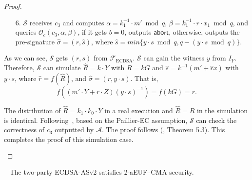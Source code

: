 \documentclass{llncs}
\begin{document}
\begin{proof}
\begin{trivlist}
\begin{itemize}
\item[6.] $\mathcal{S}$ receives $c_3$ and computes $\alpha=k_1^{-1}\cdot m' \bmod q$, $\beta=k_1^{-1}\cdot r\cdot x_1 \bmod q$, and queries $\mathcal{O}_c(c_3,\alpha,\beta)$, if it gets $b=0$, outputs $\mathsf{abort}$, otherwise, outputs the pre-signature $\hat{\sigma}=(r,\hat{s})$, where $\hat{s}=min\{y\cdot s \bmod q, q-(y\cdot s \bmod q)\}$. 
\end{itemize}
As we can see, $\mathcal{S}$ gets $(r,s)$ from $\mathcal{F}_{\text{ECDSA}}$. $\mathcal{S}$ can gain the witness $y$ from $I_Y$. Therefore, $\mathcal{S}$ can simulate $\hat{R}=k\cdot Y$ with $R=kG$ and $\hat{s}=k^{-1}(m'+\hat{r}x)$ with $y\cdot s$, where $\hat{r}=f(\hat{R})$, and $\hat{\sigma}=(r,y\cdot s)$. That is, 
$$f((m'\cdot Y+r\cdot Z)(y\cdot s)^{-1})=f(kG)=r.$$

The distribution of $\hat{R}=k_1\cdot k_0\cdot Y$ in a real execution and $\hat{R}=R$ in the simulation is identical. Following~\cite{Lin17}, based on the Paillier-EC assumption, $\mathcal{S}$ can check the correctness of $c_3$ outputted by $\mathcal{A}$. The proof follows (\cite{Lin17}, Theorem 5.3). This completes the proof of this simulation case. 
\end{trivlist}
\end{proof}


\begin{lemma}~\label{2-aEUF–CMA security proof}
The two-party ECDSA-ASv2 satisfies 2-aEUF–CMA security.
\end{lemma}
\end{document}
